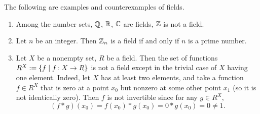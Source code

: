\begin{example}
  The following are examples and counterexamples of fields.
  \begin{enumerate}
    \item
      Among the number sets, $\mathbb{Q}$, $\mathbb{R}$, $\mathbb{C}$ are fields, $\mathbb{Z}$ is not a field.
    \item
      Let $n$ be an integer.
      Then $\mathbb{Z}_n$ is a field if and only if $n$ is a prime number.
    \item
      Let $X$ be a nonempty set, $R$ be a field.
      Then the set of functions $R^X := \left\{ f \mid f \colon X \to R \right\}$ is not a
      field except in the trivial case of $X$ having one element.
      Indeed, let $X$ has at least two elements, and take a function $f \in R^X$
      that is zero at a point $x_0$ but nonzero at some other point $x_1$
      (so it is not identically zero).
      Then $f$ is not invertible since for any $g \in R^X$,
      \begin{equation}
        (f * g)(x_0) = f(x_0) * g(x_0) = 0 * g(x_0) = 0 \neq 1.
      \end{equation}
  \end{enumerate}
\end{example}

